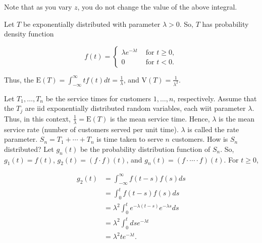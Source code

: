 \documentclass[12pt]{article}
\newcommand{\nspace}{\vspace*{.5cm}}
\newcommand{\nline}{\nspace \noindent}
\newcommand{\expected}[1]{\text{E}(#1)}
\newcommand{\variance}[1]{\text{V}(#1)}
\begin{document}
\begin{tcolorbox}
\begin{center}
\end{center}

\noindent
Note that as you vary $z$, you do not change the value of the above integral.
\end{tcolorbox}

\nline
Let $T$ be exponentially distributed with parameter $\lambda > 0$. So, $T$ has probability density function 

\[ f(t) =  \begin{cases} 
      \lambda e^{- \lambda t} & \text{ for } t \geq 0, \\
      0 & \text{ for } t < 0.
      \end{cases} \]

\noindent
Thus, the $\expected{T} = \int_{- \infty}^{\infty} t f(t) dt = \frac{1}{\lambda}$, and $\variance{T} = \frac{1}{\lambda^2}$.

\nline
Let $T_1, \ldots, T_n$ be the service times for customers $1, \ldots, n$, respectively. Assume that the $T_j$ are iid exponentially distributed random variables, each wiit parameter $\lambda$. Thus, in this context, $\frac{1}{\lambda} = \expected{T}$ is the mean service time. Hence, $\lambda$ is the mean service rate (number of customers served per unit time). $\lambda$ is called the rate parameter. $S_n = T_1 + \cdots + T_n$ is time taken to serve $n$ customers. How is $S_n$ distributed? Let $g_n(t)$ be the probability distribution function of $S_n$. So, $g_1(t) = f(t)$,  $g_2(t) = (f \cdot f)(t)$, and $g_n(t) = (f \cdot \cdots \cdot f)(t)$. For $t \geq 0$, 

\begin{align*}
g_2(t) &= \int_{- \infty}^{\infty} f(t-s)f(s) ds \\
&= \int_{0}^{t} f(t-s)f(s) ds \\
&= \lambda^2 \int_{0}^{t} e^{- \lambda (t - s) } e^{- \lambda s} ds \\
&= \lambda^2 \int_{0}^{t} ds e^{- \lambda t} \\
&= \lambda^2 t e^{- \lambda t}. \\
\end{align*}
\end{document}
